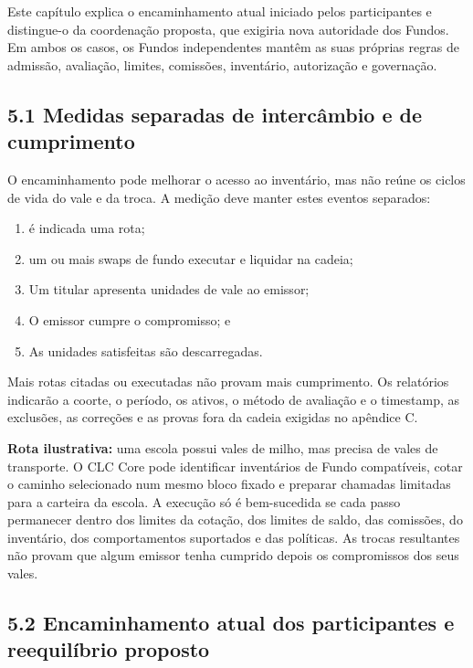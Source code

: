 \documentclass[11pt]{article}
\begin{document}
Este capítulo explica o encaminhamento atual iniciado pelos participantes e distingue-o da coordenação proposta, que exigiria nova autoridade dos Fundos. Em ambos os casos, os Fundos independentes mantêm as suas próprias regras de admissão, avaliação, limites, comissões, inventário, autorização e governação.

\subsection*{5.1 Medidas separadas de intercâmbio e de cumprimento}

O encaminhamento pode melhorar o acesso ao inventário, mas não reúne os ciclos de vida do vale e da troca. A medição deve manter estes eventos separados:

\begin{enumerate}[leftmargin=*]
\item é indicada uma rota;
\item um ou mais swaps de fundo executar e liquidar na cadeia;
\item Um titular apresenta unidades de vale ao emissor;
\item O emissor cumpre o compromisso; e
\item As unidades satisfeitas são descarregadas.
\end{enumerate}
Mais rotas citadas ou executadas não provam mais cumprimento. Os relatórios indicarão a coorte, o período, os ativos, o método de avaliação e o timestamp, as exclusões, as correções e as provas fora da cadeia exigidas no apêndice C.

\textbf{Rota ilustrativa:} uma escola possui vales de milho, mas precisa de vales de transporte. O CLC Core pode identificar inventários de Fundo compatíveis, cotar o caminho selecionado num mesmo bloco fixado e preparar chamadas limitadas para a carteira da escola. A execução só é bem-sucedida se cada passo permanecer dentro dos limites da cotação, dos limites de saldo, das comissões, do inventário, dos comportamentos suportados e das políticas. As trocas resultantes não provam que algum emissor tenha cumprido depois os compromissos dos seus vales.

\subsection*{5.2 Encaminhamento atual dos participantes e reequilíbrio proposto}
\end{document}

